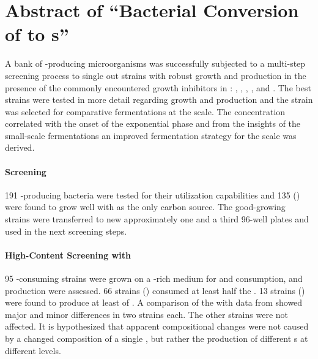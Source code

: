 \cleardoublepage
{}
\pagestyle{plain}
\section*{Abstract of \enquote{Bacterial Conversion of \LCH{} to \EPS{}s}}
A bank of \eps{}-producing microorganisms was successfully subjected to a multi-step screening process to single out strains with robust growth and \eps{} production in the presence of the commonly encountered growth inhibitors in \lch{}: \fur{}, \hmf{}, \van{}, \fora{}, \acet{} and \laev{}. The best strains were tested in more detail regarding growth and production and the strain \strain{} was selected for comparative fermentations at the  scale. The \fur{} concentration correlated with the onset of the exponential phase and from the insights of the small-scale fermentations an improved fermentation strategy for the  scale was derived.

\paragraph{\XYL{} Screening}
191 \eps{}-producing bacteria were tested for their \xyl{} utilization capabilities and 135 () were found to grow well with \xyl{} as the only carbon source. The good-growing strains were transferred to new approximately one and a third 96-well plates and used in the next screening steps.

\paragraph{High-Content Screening with \XYL{}}
95 \xyl{}-consuming strains were grown on a \xyl{}-rich medium for  and \xyl{} consumption, \eps{} \amc{} and production were assessed. 66 strains () consumed at least half the \xyl{}. 13 strains () were found to produce at least  of \eps{}. A comparison of the \eps{} \amc{} with data from \textcite{Ruehmann2015a} showed major and minor differences in two strains each. The other strains were not affected. It is hypothesized that apparent \eps{} compositional changes were not caused by a changed composition of a single \eps{}, but rather the production of different \eps{}s at different levels.

